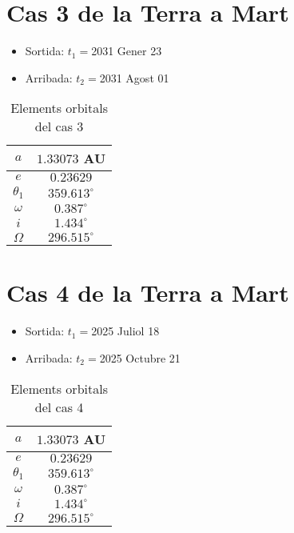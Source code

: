\section{Cas 3 de la Terra a Mart}
\begin{itemize}
	\item Sortida: $t_{1}=$2031 Gener 23
	\item Arribada: $t_{2}=$2031 Agost 01
\end{itemize}
\begin{table}[h!]
	\centering
	\begin{tabular}{ |c|c|}
		\hline
		$a$ & $1.33073$ AU \\ \hline
		$e$ & $0.23629$ \\ \hline
		$\theta_{1}$ & $359.613^{\circ}$ \\ \hline
		$\omega$ & $0.387^{\circ}$ \\ \hline
		$i$ & $1.434^{\circ}$ \\ \hline
		$\Omega$ & $296.515^{\circ}$ \\ \hline
	\end{tabular}
	\caption{Elements orbitals del cas 3}
\end{table}

\section{Cas 4 de la Terra a Mart}
\begin{itemize}
	\item Sortida: $t_{1}=$2025 Juliol 18
	\item Arribada: $t_{2}=$2025 Octubre 21
\end{itemize}
\begin{table}[h!]
	\centering
	\begin{tabular}{ |c|c|}
		\hline
		$a$ & $1.33073$ AU \\ \hline
		$e$ & $0.23629$ \\ \hline
		$\theta_{1}$ & $359.613^{\circ}$ \\ \hline
		$\omega$ & $0.387^{\circ}$ \\ \hline
		$i$ & $1.434^{\circ}$ \\ \hline
		$\Omega$ & $296.515^{\circ}$ \\ \hline
	\end{tabular}
	\caption{Elements orbitals del cas 4}
\end{table}

